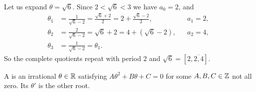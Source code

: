\documentclass[a4paper]{scrartcl}
\begin{document}
\begin{example}
	Let us expand $\theta = \sqrt6$. Since $2 < \sqrt6 < 3$ we have $a_0 = 2$, and
	\begin{align*}
		\theta_1 &= \frac1{\sqrt6 - 2} = \frac{\sqrt6+2}{2} = 2 + \frac{\sqrt6 - 2}2, &&a_1 = 2, \\
		\theta_2 &= \frac2{\sqrt6-2} = \sqrt6 + 2 = 4 + (\sqrt 6 - 2), &&a_2 = 4, \\
		\theta_3 &= \frac1{\sqrt6-2} = \theta_1.
	\end{align*}
	So the complete quotients repeat with period $2$ and $\sqrt6 = [2, \overline{2, 4}]$.
\end{example}

\begin{definition}
	A  is an irrational $\theta \in \mathbb{R}$ satisfying $A\theta^2 + B\theta + C = 0$ for some $A, B, C \in \mathbb{Z}$ not all zero. Its  $\theta'$ is the other root.
\end{definition}
\end{document}

